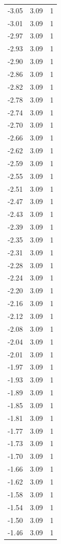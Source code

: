 \begin{longtable}{lrr}
  -3.05 & 3.09 & 1 \\
  -3.01 & 3.09 & 1 \\
  -2.97 & 3.09 & 1 \\
  -2.93 & 3.09 & 1 \\
  -2.90 & 3.09 & 1 \\
  -2.86 & 3.09 & 1 \\
  -2.82 & 3.09 & 1 \\
  -2.78 & 3.09 & 1 \\
  -2.74 & 3.09 & 1 \\
  -2.70 & 3.09 & 1 \\
  -2.66 & 3.09 & 1 \\
  -2.62 & 3.09 & 1 \\
  -2.59 & 3.09 & 1 \\
  -2.55 & 3.09 & 1 \\
  -2.51 & 3.09 & 1 \\
  -2.47 & 3.09 & 1 \\
  -2.43 & 3.09 & 1 \\
  -2.39 & 3.09 & 1 \\
  -2.35 & 3.09 & 1 \\
  -2.31 & 3.09 & 1 \\
  -2.28 & 3.09 & 1 \\
  -2.24 & 3.09 & 1 \\
  -2.20 & 3.09 & 1 \\
  -2.16 & 3.09 & 1 \\
  -2.12 & 3.09 & 1 \\
  -2.08 & 3.09 & 1 \\
  -2.04 & 3.09 & 1 \\
  -2.01 & 3.09 & 1 \\
  -1.97 & 3.09 & 1 \\
  -1.93 & 3.09 & 1 \\
  -1.89 & 3.09 & 1 \\
  -1.85 & 3.09 & 1 \\
  -1.81 & 3.09 & 1 \\
  -1.77 & 3.09 & 1 \\
  -1.73 & 3.09 & 1 \\
  -1.70 & 3.09 & 1 \\
  -1.66 & 3.09 & 1 \\
  -1.62 & 3.09 & 1 \\
  -1.58 & 3.09 & 1 \\
  -1.54 & 3.09 & 1 \\
  -1.50 & 3.09 & 1 \\
  -1.46 & 3.09 & 1 \\

\end{longtable}
